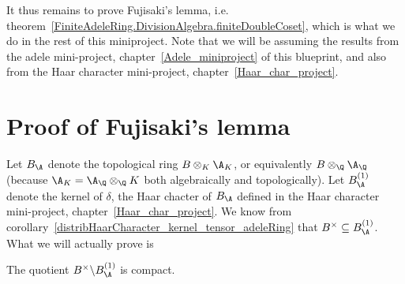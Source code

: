 It thus remains to prove Fujisaki's lemma, i.e. theorem~\ref{FiniteAdeleRing.DivisionAlgebra.finiteDoubleCoset},
which is what we do in the rest of this
miniproject. Note that we will be assuming the results
from the adele mini-project, chapter~\ref{Adele_miniproject} of this blueprint,
and also from the Haar character mini-project, chapter~\ref{Haar_char_project}.

\section{Proof of Fujisaki's lemma}

Let $B_{\A}$ denote the topological ring $B\otimes_K\A_K$, or equivalently $B\otimes_{\Q}\A_{\Q}$
(because $\A_K=\A_{\Q}\otimes_{\Q}K$ both algebraically and topologically). Let $B_{\A}^{(1)}$
denote the kernel of $\delta$, the Haar chacter of $B_{\A}$ defined in the Haar character
mini-project, chapter~\ref{Haar_char_project}. We know from
corollary~\ref{distribHaarCharacter_kernel_tensor_adeleRing} that $B^\times\subseteq B_{\A}^{(1)}$.
What we will actually prove is

\begin{theorem}
  \label{AdeleRing.DivisionAlgebra.compact_quotient} The quotient $B^\times\backslash B_{\A}^{(1)}$
  is compact.
\end{theorem}

